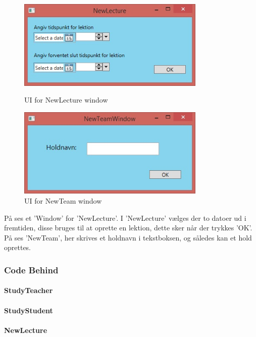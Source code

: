 \begin{figure}[htbp]
\centering
\begin{minipage}{.5\textwidth}
  \centering
  \includegraphics[width=0.8\textwidth]{images/UI/NewLecture.jpg}
  \caption[UINewLecture]{UI for NewLecture window}
  \label{fig:NewLecture}
\end{minipage}%
\begin{minipage}{.5\textwidth}
  \centering
  \includegraphics[width=0.8\textwidth]{images/UI/NewTeam.jpg}
  \caption[UINewTeam]{UI for NewTeam window}
  \label{fig:NewTeam}
\end{minipage}%
\end{figure}

På  ses et 'Window' for 'NewLecture'. 
I 'NewLecture' vælges der to datoer ud i fremtiden, disse bruges til at oprette en lektion, dette sker når der trykkes 'OK'. 
På  ses 'NewTeam', her skrives et holdnavn i tekstboksen, og således kan et hold oprettes.

\subsubsection{Code Behind}
\paragraph{StudyTeacher}
\paragraph{StudyStudent}
\paragraph{NewLecture}